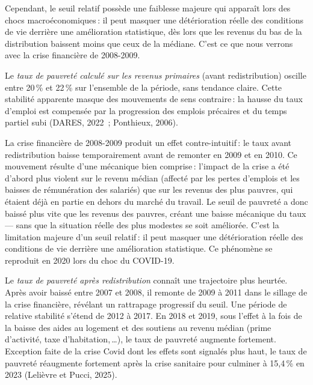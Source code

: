 \documentclass[
  french,
  9pt,
  a4paper,
]{article}
\begin{document}
Cependant, le seuil relatif possède une faiblesse majeure qui apparaît
lors des chocs macroéconomiques\,: il peut masquer une détérioration
réelle des conditions de vie derrière une amélioration statistique, dès
lors que les revenus du bas de la distribution baissent moins que ceux
de la médiane. C'est ce que nous verrons avec la crise financière de
2008-2009.

Le \emph{taux de pauvreté calculé sur les revenus primaires} (avant
redistribution) oscille entre 20\,\% et 22\,\% sur l'ensemble de la
période, sans tendance claire. Cette stabilité apparente masque des
mouvements de sens contraire\,: la hausse du taux d'emploi est compensée
par la progression des emplois précaires et du temps partiel subi
(DARES, 2022~; Ponthieux, 2006).

La crise financière de 2008-2009 produit un effet contre-intuitif\,: le
taux avant redistribution baisse temporairement avant de remonter en
2009 et en 2010. Ce mouvement résulte d'une mécanique bien comprise\,:
l'impact de la crise a été d'abord plus violent sur le revenu médian
(affecté par les pertes d'emplois et les baisses de rémunération des
salariés) que sur les revenus des plus pauvres, qui étaient déjà en
partie en dehors du marché du travail. Le seuil de pauvreté a donc
baissé plus vite que les revenus des pauvres, créant une baisse
mécanique du taux\,--- sans que la situation réelle des plus modestes se
soit améliorée. C'est la limitation majeure d'un seuil relatif\,: il
peut masquer une détérioration réelle des conditions de vie derrière une
amélioration statistique. Ce phénomène se reproduit en 2020 lors du choc
du COVID-19.

Le \emph{taux de pauvreté après redistribution} connaît une trajectoire
plus heurtée. Après avoir baissé entre 2007 et 2008, il remonte de 2009
à 2011 dans le sillage de la crise financière, révélant un rattrapage
progressif du seuil. Une période de relative stabilité s'étend de 2012 à
2017. En 2018 et 2019, sous l'effet à la fois de la baisse des aides au
logement et des soutiens au revenu médian (prime d'activité, taxe
d'habitation,\,\ldots), le taux de pauvreté augmente fortement.
Exception faite de la crise Covid dont les effets sont signalés plus
haut, le taux de pauvreté réaugmente fortement après la crise sanitaire
pour culminer à 15,4\,\% en 2023 (Lelièvre et Pucci, 2025).
\end{document}
